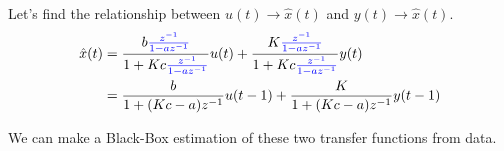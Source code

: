 Let's find the relationship between $u(t) \rightarrow \hat{x}(t)$ and $y(t) \rightarrow \hat{x}(t)$.
\begin{align*}
    \hat{x}(t) &= \frac{b {\color{blue}\frac{z^{-1}}{1-az^{-1}}}}{1+Kc{\color{blue}\frac{z^{-1}}{1-az^{-1}}}} u(t) + \frac{ K{\color{blue}\frac{z^{-1}}{1-az^{-1}}} }{1+Kc{\color{blue}\frac{z^{-1}}{1-az^{-1}}}} y(t) \\
    &= \frac{b}{1+(Kc-a)z^{-1}}u(t-1) + \frac{K}{1+(Kc-a)z^{-1}} y(t-1)
\end{align*}

We can make a Black-Box estimation of these two transfer functions from data.
